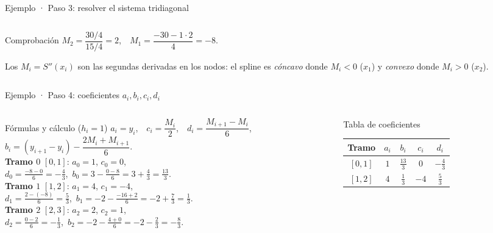 \documentclass[aspectratio=169,10pt]{beamer}
\begin{document}
\begin{frame}{Ejemplo · Paso 3: resolver el sistema tridiagonal}
\begin{columns}[T]
\begin{column}{0.48\textwidth}
\begin{cardgear}{Comprobación}{\faCogs}
{$M_2=\dfrac{30/4}{15/4}=2$,\ \ $M_1=\dfrac{-30-1\cdot2}{4}=-8$.}
\end{cardgear}
\vspace{1mm}
\begin{cardnota}[\faInfoCircle]
{\footnotesize Los $M_i=S''(x_i)$ son las segundas derivadas en los nodos: el spline es \emph{cóncavo} donde $M_i<0$ ($x_1$) y \emph{convexo} donde $M_i>0$ ($x_2$).}
\end{cardnota}
\end{column}
\end{columns}
\end{frame}

\begin{frame}{Ejemplo · Paso 4: coeficientes $a_i,b_i,c_i,d_i$}
\begin{columns}[T]
\begin{column}{0.5\textwidth}
\begin{cardidea}{Fórmulas y cálculo ($h_i=1$)}{\faSuperscript}
{\footnotesize $a_i=y_i$,\ \ $c_i=\dfrac{M_i}{2}$,\ \ $d_i=\dfrac{M_{i+1}-M_i}{6}$,\\[0.6mm]
$b_i=(y_{i+1}-y_i)-\dfrac{2M_i+M_{i+1}}{6}$.\\[1.2mm]
\textbf{Tramo $0$} $[0,1]$: $a_0=1$, $c_0=0$,\\[0.2mm]
$d_0=\tfrac{-8-0}{6}=-\tfrac43$,\ $b_0=3-\tfrac{0-8}{6}=3+\tfrac43=\tfrac{13}{3}$.\\[0.8mm]
\textbf{Tramo $1$} $[1,2]$: $a_1=4$, $c_1=-4$,\\[0.2mm]
$d_1=\tfrac{2-(-8)}{6}=\tfrac53$,\ $b_1=-2-\tfrac{-16+2}{6}=-2+\tfrac73=\tfrac13$.\\[0.8mm]
\textbf{Tramo $2$} $[2,3]$: $a_2=2$, $c_2=1$,\\[0.2mm]
$d_2=\tfrac{0-2}{6}=-\tfrac13$,\ $b_2=-2-\tfrac{4+0}{6}=-2-\tfrac23=-\tfrac83$.}
\end{cardidea}
\end{column}
\begin{column}{0.48\textwidth}
\begin{cardgear}{Tabla de coeficientes}{\faTable}
\centering
{\footnotesize\renewcommand{\arraystretch}{1.4}\setlength{\tabcolsep}{6pt}
\begin{tabular}{c|cccc}
Tramo & $a_i$ & $b_i$ & $c_i$ & $d_i$\\\hline
$[0,1]$ & $1$ & $\tfrac{13}{3}$ & $0$ & $-\tfrac43$\\
$[1,2]$ & $4$ & $\tfrac13$ & $-4$ & $\tfrac53$\\

\end{tabular}}
\end{cardgear}
\end{column}
\end{columns}
\end{frame}
\end{document}
